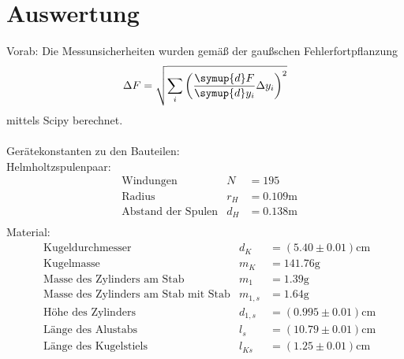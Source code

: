 \section{Auswertung}
\label{sec:Auswertung}
Vorab: Die Messunsicherheiten wurden gemäß der gaußschen Fehlerfortpflanzung
\begin{equation}
  \label{eqn:Gauss}
  \Delta F = \sqrt{\sum_i\left(\frac{\symup{d}F}{\symup{d}y_i}\Delta y_i \right)^2}
\end{equation}
mittels Scipy \cite{scipy}  berechnet.\\
\\
Gerätekonstanten zu den Bauteilen:\\
Helmholtzspulenpaar:
\begin{align*}
    &\text{Windungen}& N &= 195 \\
    &\text{Radius}& r_H &= 0.109 \unit{\metre} \\
    &\text{Abstand der Spulen}& d_H &= 0.138 \unit{\metre} \\
\end{align*}
Material:
\begin{align*}
    &\text{Kugeldurchmesser}& d_K &= (5.40 \pm 0.01) \unit{\centi\metre} \\
    &\text{Kugelmasse}& m_K &=  141.76  \unit{\gram} \\
    &\text{Masse des Zylinders am Stab}& m_1 &=  1.39  \unit{\gram} \\
    &\text{Masse des Zylinders am Stab mit Stab}& m_{1,s} &= 1.64 \unit{\gram} \\
    &\text{Höhe des Zylinders}& d_{1,s} &= (0.995 \pm 0.01) \unit{\centi\metre} \\
    &\text{Länge des Alustabs}& l_s &= (10.79 \pm 0.01) \unit{\centi\metre} \\
    &\text{Länge des Kugelstiels}& l_{Ks} &= (1.25 \pm 0.01) \unit{\centi\metre} \\
\end{align*}

